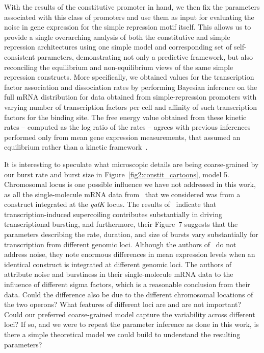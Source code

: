 With the results of the constitutive promoter in hand, we then fix the
parameters associated with this class of promoters and use them as input for
evaluating the noise in gene expression for the simple repression motif itself.
This allows us to provide a single overarching analysis of both the constitutive
and simple repression architectures using one simple model and corresponding set
of self-consistent parameters, demonstrating not only a predictive framework,
but also reconciling the equilibrium and non-equilibrium views of the same
simple repression constructs. More specifically, we obtained values for the
transcription factor association and dissociation rates by performing Bayesian
inference on the full mRNA distribution for data obtained from simple-repression
promoters with varying number of transcription factors per cell and affinity of
such transcription factors for the binding site. The free energy value obtained
from these kinetic rates -- computed as the log ratio of the rates -- agrees
with previous inferences performed only from mean gene expression measurements,
that assumed an equilibrium rather than a kinetic
framework~\cite{Garcia2011a, Razo-Mejia2018}.

It is interesting to speculate what microscopic details are being coarse-grained
by our burst rate and burst size in Figure~\ref{fig2:constit_cartoons}, model 5.
Chromosomal locus is one possible influence we have not addressed in this work,
as all the single-molecule mRNA data from~\cite{Jones2014} that we considered
was from a construct integrated at the \textit{galK} locus. The results
of~\cite{Chong2014} indicate that transcription-induced supercoiling contributes
substantially in driving transcriptional bursting, and furthermore, their
Figure~7 suggests that the parameters describing the rate, duration, and size of
bursts vary substantially for transcription from different genomic loci.
Although the authors of~\cite{Englaender2017} do not address noise, they note
enormous differences in mean expression levels when an identical construct is
integrated at different genomic loci. The authors of~\cite{Engl2020} attribute
noise and burstiness in their single-molecule mRNA data to the influence of
different sigma factors, which is a reasonable conclusion from their data. Could
the difference also be due to the different chromosomal locations of the two
operons?
What features of different loci are and are not important?
Could our preferred coarse-grained model capture the variability across
different loci? If so, and we were to repeat the parameter inference
as done in this work, is there a simple theoretical model we could build
to understand the resulting parameters?

